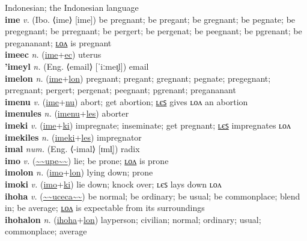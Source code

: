 Indonesian; the Indonesian language \label{'intonesiatilip} \\
\textbf{ime} \textit{v.} (Ibo. ⟨ime⟩ [ime])
be pregnant; be pregant; be gregnant; be pegnate; be pregegnant; be prregnant; be pergert; be pergenat; be peegnant; be pgrenant; be pregananant; \hyperref[imelon]{ʟᴏᴧ} is pregnant \label{ime} \\
\textbf{imeec} \textit{n.} (\hyperref[ime]{ime}+\hyperref[ec]{ec})
uterus \label{imeec} \\
\textbf{'imeyl} \textit{n.} (Eng. ⟨email⟩ [ˈiːmeɪ̯l])
email \label{'imeyl} \\
\textbf{imelon} \textit{n.} (\hyperref[ime]{ime}+\hyperref[lon]{lon})
pregnant; pregant; gregnant; pegnate; pregegnant; prregnant; pergert; pergenat; peegnant; pgrenant; pregananant \label{imelon} \\
\textbf{imenu} \textit{v.} (\hyperref[ime]{ime}+\hyperref[nu]{nu})
abort; get abortion; \hyperref[imenules]{ʟєꜱ} gives ʟᴏᴧ an abortion \label{imenu} \\
\textbf{imenules} \textit{n.} (\hyperref[imenu]{imenu}+\hyperref[les]{les})
aborter \label{imenules} \\
\textbf{imeki} \textit{v.} (\hyperref[ime]{ime}+\hyperref[ki]{ki})
impregnate; inseminate; get pregnant; \hyperref[imekiles]{ʟєꜱ} impregnates ʟᴏᴧ \label{imeki} \\
\textbf{imekiles} \textit{n.} (\hyperref[imeki]{imeki}+\hyperref[les]{les})
impregnator \label{imekiles} \\
\textbf{imal} \textit{num.} (Eng. ⟨-imal⟩ [ɪml̩])
radix \label{imal} \\
\textbf{imo} \textit{v.} (\hyperref[upe]{\~{}\~{}upe\~{}\~{}})
lie; be prone; \hyperref[imolon]{ʟᴏᴧ} is prone \label{imo} \\
\textbf{imolon} \textit{n.} (\hyperref[imo]{imo}+\hyperref[lon]{lon})
lying down; prone \label{imolon} \\
\textbf{imoki} \textit{v.} (\hyperref[imo]{imo}+\hyperref[ki]{ki})
lie down; knock over; ʟєꜱ lays down ʟᴏᴧ \label{imoki} \\
\textbf{ihoha} \textit{v.} (\hyperref[uceca]{\~{}\~{}uceca\~{}\~{}})
be normal; be ordinary; be usual; be commonplace; blend in; be average; \hyperref[ihohalon]{ʟᴏᴧ} is expectable from its surroundings \label{ihoha} \\
\textbf{ihohalon} \textit{n.} (\hyperref[ihoha]{ihoha}+\hyperref[lon]{lon})
layperson; civilian; normal; ordinary; usual; commonplace; average \label{ihohalon} \\
